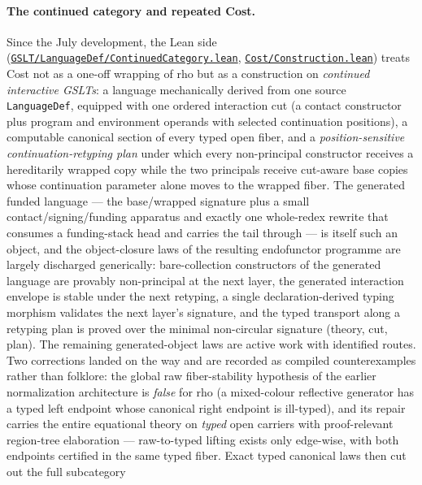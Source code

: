 \documentclass[11pt]{article}
\newcommand{\code}[1]{\texttt{#1}}
\begin{document}
\paragraph{The continued category and repeated Cost.}  Since the July
development, the Lean side
(\href{https://github.com/zariuq/MeTTapedia/blob/main/lean/mettapedia/Mettapedia/GSLT/LanguageDef/ContinuedCategory.lean}{\code{GSLT/LanguageDef/ContinuedCategory.lean}},
\href{https://github.com/zariuq/MeTTapedia/blob/main/lean/mettapedia/Mettapedia/GSLT/LanguageDef/Cost/Construction.lean}{\code{Cost/Construction.lean}})
treats Cost not as a one-off wrapping of rho but
as a construction on \emph{continued interactive GSLTs}: a language
mechanically derived from one source \code{LanguageDef}, equipped with
one ordered interaction cut (a contact constructor plus program and
environment operands with selected continuation positions), a computable
canonical section of every typed open fiber, and a
\emph{position-sensitive continuation-retyping plan} under which every
non-principal constructor receives a hereditarily wrapped copy while the
two principals receive cut-aware base copies whose continuation parameter
alone moves to the wrapped fiber.  The generated funded language --- the
base/wrapped signature plus a small contact/signing/funding apparatus and
exactly one whole-redex rewrite that consumes a funding-stack head and
carries the tail through --- is itself such an object, and the
object-closure laws of the resulting endofunctor programme are largely
discharged generically: bare-collection constructors of the generated
language are provably non-principal at the next layer, the generated
interaction envelope is stable under the next retyping, a single
declaration-derived typing morphism validates the next layer's signature,
and the typed transport along a retyping plan is proved over the minimal
non-circular signature (theory, cut, plan).  The remaining generated-object
laws are active work with identified routes.  Two corrections landed on the
way and are recorded as compiled counterexamples rather than folklore: the
global raw fiber-stability hypothesis of the earlier normalization
architecture is \emph{false} for rho (a mixed-colour reflective generator
has a typed left endpoint whose canonical right endpoint is ill-typed), and
its repair carries the entire equational theory on \emph{typed} open
carriers with proof-relevant region-tree elaboration --- raw-to-typed
lifting exists only edge-wise, with both endpoints certified in the same
typed fiber.  Exact typed canonical laws then cut out the full subcategory
\end{document}
